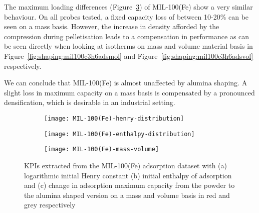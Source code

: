 The maximum loading differences (Figure~\ref{fig:shaping:analysismil100basis})
of MIL-100(Fe) show a very similar behaviour. 
On all probes tested, a fixed capacity 
loss of between 10-20\% can be seen on a mass 
basis. However, the increase in density afforded by the 
compression during pelletisation leads to a compensation in 
performance as can be seen directly when looking at isotherms on mass and 
volume material basis in Figure~\ref{fig:shaping:mil100c3h6adsmol} and 
Figure~\ref{fig:shaping:mil100c3h6adsvol} respectively.

We can conclude that MIL-100(Fe) is almost unaffected by alumina shaping.
A slight loss in maximum capacity on a mass basis is compensated by a pronounced densification, which is desirable in an industrial setting.

\begin{figure}
    \centering
    \begin{subfigure}{0.8\textwidth}
        \parbox[c]{0.1\linewidth}{\caption{}%
        \label{fig:shaping:analysismil100henry}}%
        \parbox[b]{0.7\linewidth}{%
        \texttt{[image: MIL-100(Fe)-henry-distribution]}%
        }%
    \end{subfigure}

    \begin{subfigure}{0.8\textwidth}
        \parbox[c]{0.1\linewidth}{\caption{}%
        \label{fig:shaping:analysismil100enth}}%
        \parbox[b]{0.7\linewidth}{%
        \texttt{[image: MIL-100(Fe)-enthalpy-distribution]}%
        }%
    \end{subfigure}

    \begin{subfigure}{0.8\textwidth}
        \parbox[c]{0.1\linewidth}{\caption{}%
        \label{fig:shaping:analysismil100basis}}%
        \parbox[b]{0.7\linewidth}{%
        \texttt{[image: MIL-100(Fe)-mass-volume]}%
        }%
    \end{subfigure}
    
    \caption{KPIs extracted from the MIL-100(Fe) adsorption dataset with
    (a) logarithmic initial Henry constant (b) initial enthalpy of 
    adsorption and (c) change in adsorption maximum capacity from the powder
    to the alumina shaped version on a mass and volume basis in red and grey
    respectively}%
    \label{fig:shaping:analysismil100}
\end{figure}
